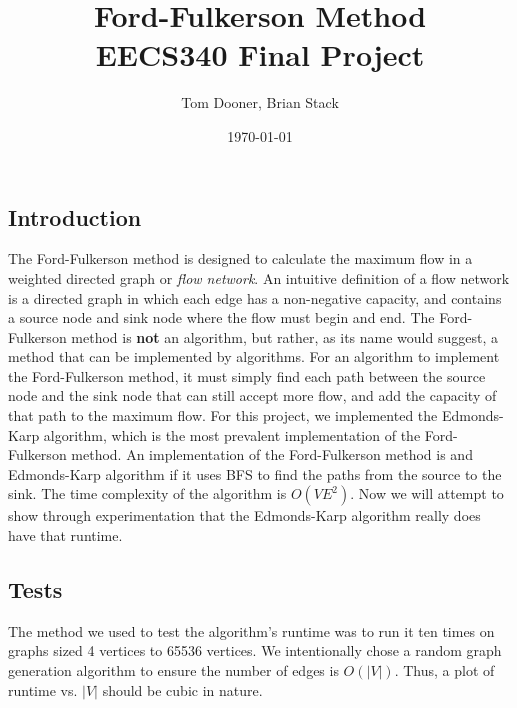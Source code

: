 \documentclass[letterpaper,notitlepage]{report}
\title{Ford-Fulkerson Method \\ \small{EECS340 Final Project}}
\author{Tom Dooner, Brian Stack}
\date{\today}
\begin{document}
\begin{singlespace}
\maketitle
\end{singlespace}

\subsection*{Introduction}

The Ford-Fulkerson method is designed to calculate the maximum flow in a weighted directed graph or \textit{flow network}.  An intuitive definition of a flow network is a directed graph in which each edge has a non-negative capacity, and contains a source node and sink node where the flow must begin and end.  The Ford-Fulkerson method is \textbf{not} an algorithm, but rather, as its name would suggest, a method that can be implemented by algorithms.  For an algorithm to implement the Ford-Fulkerson method, it must simply find each path between the source node and the sink node that can still accept more flow, and add the capacity of that path to the maximum flow.  For this project, we implemented the Edmonds-Karp algorithm, which is the most prevalent implementation of the Ford-Fulkerson method.  An implementation of the Ford-Fulkerson method is and Edmonds-Karp algorithm if it uses BFS to find the paths from the source to the sink. The time complexity of the algorithm is $O(VE^2)$.  Now we will attempt to show through experimentation that the Edmonds-Karp algorithm really does have that runtime.

\subsection*{Tests}

The method we used to test the algorithm's runtime was to run it ten times on graphs sized 4 vertices to 65536 vertices. We intentionally chose a random graph generation algorithm to ensure the number of edges is $O(|V|)$. Thus, a plot of runtime vs. $|V|$ should be cubic in nature.
\end{document}
